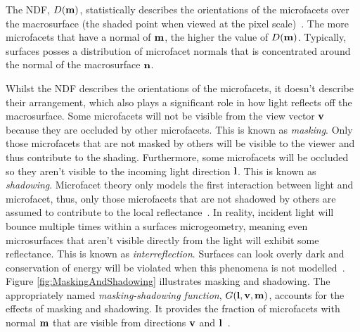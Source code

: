 The NDF, \begin{math}D(\mathbf{m})\end{math}, statistically describes the orientations of the microfacets over the macrosurface (the shaded point when viewed at the pixel scale)~\cite{HeitzMicrofacetTheory}. The more microfacets that have a normal of \begin{math}\mathbf{m}\end{math}, the higher the value of \begin{math}D(\mathbf{m})\end{math}. Typically, surfaces posses a distribution of microfacet normals that is concentrated around the normal of the macrosurface \begin{math}\mathbf{n}\end{math}.

Whilst the NDF describes the orientations of the microfacets, it doesn't describe their arrangement, which also plays a significant role in how light reflects off the macrosurface. Some microfacets will not be visible from the view vector \begin{math}\mathbf{v}\end{math} because they are occluded by other microfacets. This is known as \textit{masking}. Only those microfacets that are not masked by others will be visible to the viewer and thus contribute to the shading. Furthermore, some microfacets will be occluded so they aren't visible to the incoming light direction \begin{math}\mathbf{l}\end{math}. This is known as \textit{shadowing}. Microfacet theory only models the first interaction between light and microfacet, thus, only those microfacets that are not shadowed by others are assumed to contribute to the local reflectance~\cite{HeitzMicrofacetTheory}. In reality, incident light will bounce multiple times within a surfaces microgeometry, meaning even microsurfaces that aren't visible directly from the light will exhibit some reflectance. This is known as \textit{interreflection}. Surfaces can look overly dark and conservation of energy will be violated when this phenomena is not modelled~\cite{MultipleScatteringMicrofacet}. Figure \ref{fig:MaskingAndShadowing} illustrates masking and shadowing. The appropriately named \textit{masking-shadowing function}, \begin{math}G(\mathbf{l}, \mathbf{v}, \mathbf{m})\end{math}, accounts for the effects of masking and shadowing. It provides the fraction of microfacets with normal \begin{math}\mathbf{m}\end{math} that are visible from directions \begin{math}\mathbf{v}\end{math} and \begin{math}\mathbf{l}\end{math}~\cite{BlinnModelsOfLightReflection}.

